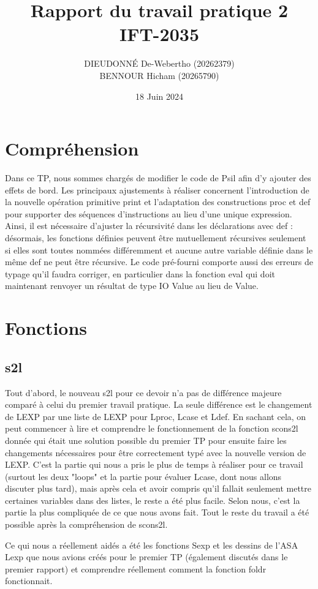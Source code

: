 \documentclass[12pt, a4paper]{article}
\title{
    \vspace{2cm}
    \Huge \textbf{Rapport du travail pratique 2} \\
    \vspace{1cm}
    \LARGE IFT-2035 \\
    \vspace{2cm}
}
\author{
    DIEUDONNÉ De-Webertho (20262379) \\ BENNOUR Hicham (20265790)
}
\date{18 Juin 2024}
\begin{document}
\maketitle
\thispagestyle{empty}
\newpage

\section{Compréhension}
Dans ce TP, nous sommes chargés de modifier le code de Psil afin d'y ajouter des effets de bord. Les principaux ajustements à réaliser concernent l'introduction de la nouvelle opération primitive print et l'adaptation des constructions proc et def pour supporter des séquences d'instructions au lieu d'une unique expression. Ainsi, il est nécessaire d'ajuster la récursivité dans les déclarations avec def : désormais, les fonctions définies peuvent être mutuellement récursives seulement si elles sont toutes nommées différemment et aucune autre variable définie dans le même def ne peut être récursive. Le code pré-fourni comporte aussi des erreurs de typage qu'il faudra corriger, en particulier dans la fonction eval qui doit maintenant renvoyer un résultat de type IO Value au lieu de Value.
\section{Fonctions}

\subsection{s2l}
Tout d'abord, le nouveau s2l pour ce devoir n'a pas de différence majeure comparé à celui du premier travail pratique. La seule différence est le changement de LEXP par une liste de LEXP pour Lproc, Lcase et Ldef. En sachant cela, on peut commencer à lire et comprendre le fonctionnement de la fonction scons2l donnée qui était une solution possible du premier TP pour ensuite faire les changements nécessaires pour être correctement typé avec la nouvelle version de LEXP. C'est la partie qui nous a pris le plus de temps à réaliser pour ce travail (surtout les deux "loops" et la partie pour évaluer Lcase, dont nous allons discuter plus tard), mais après cela et avoir compris qu'il fallait seulement mettre certaines variables dans des listes, le reste a été plus facile. Selon nous, c'est la partie la plus compliquée de ce que nous avons fait. Tout le reste du travail a été possible après la compréhension de scons2l.

Ce qui nous a réellement aidés a été les fonctions Sexp et les dessins de l'ASA Lexp que nous avions créés pour le premier TP (également discutés dans le premier rapport) et comprendre réellement comment la fonction foldr fonctionnait.
\end{document}
